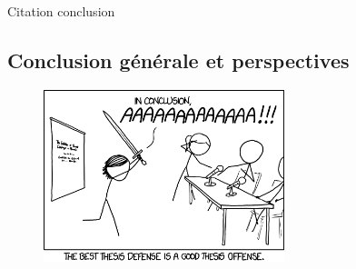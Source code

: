 
\begin{savequote}[60mm]
Citation conclusion
\end{savequote}

{}

\vspace*{-1cm}
\begin{flushright}
\chapter*{Conclusion générale et perspectives}
\end{flushright}
\vspace{2cm}

\chead[\fancyplain{}{}]
      {\fancyplain{}{}}
\lfoot[\fancyplain{}{\thepage}]
      {\fancyplain{}{}}
\cfoot[\fancyplain{}{}]
      {\fancyplain{}{}}
\rfoot[\fancyplain{}{}]
     {\fancyplain{}{\thepage}}


\begin{figure}[h!]
\centering
\includegraphics[width=7cm,clip]{../Conclusion/Images/thesis_defense_2x.png}
\end{figure}
